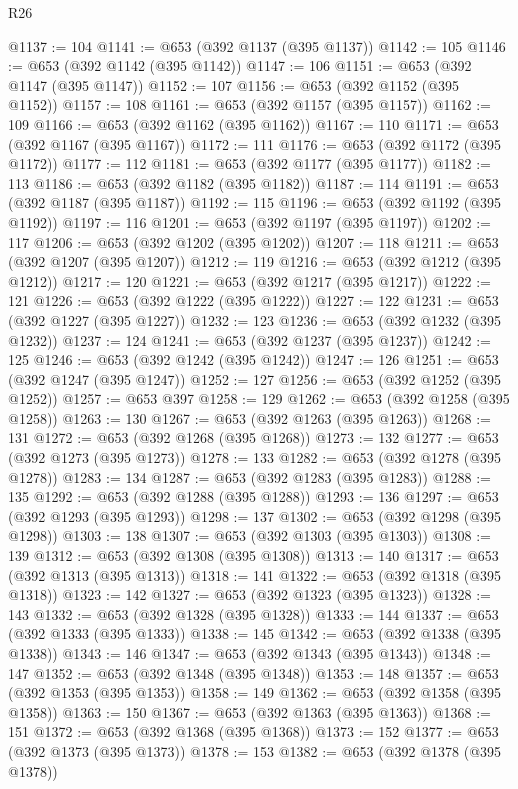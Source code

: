 \begin{lexlean}{R26}
\begin{coremodule}
@1137 := 104
@1141 := @653 (@392 @1137 (@395 @1137))
@1142 := 105
@1146 := @653 (@392 @1142 (@395 @1142))
@1147 := 106
@1151 := @653 (@392 @1147 (@395 @1147))
@1152 := 107
@1156 := @653 (@392 @1152 (@395 @1152))
@1157 := 108
@1161 := @653 (@392 @1157 (@395 @1157))
@1162 := 109
@1166 := @653 (@392 @1162 (@395 @1162))
@1167 := 110
@1171 := @653 (@392 @1167 (@395 @1167))
@1172 := 111
@1176 := @653 (@392 @1172 (@395 @1172))
@1177 := 112
@1181 := @653 (@392 @1177 (@395 @1177))
@1182 := 113
@1186 := @653 (@392 @1182 (@395 @1182))
@1187 := 114
@1191 := @653 (@392 @1187 (@395 @1187))
@1192 := 115
@1196 := @653 (@392 @1192 (@395 @1192))
@1197 := 116
@1201 := @653 (@392 @1197 (@395 @1197))
@1202 := 117
@1206 := @653 (@392 @1202 (@395 @1202))
@1207 := 118
@1211 := @653 (@392 @1207 (@395 @1207))
@1212 := 119
@1216 := @653 (@392 @1212 (@395 @1212))
@1217 := 120
@1221 := @653 (@392 @1217 (@395 @1217))
@1222 := 121
@1226 := @653 (@392 @1222 (@395 @1222))
@1227 := 122
@1231 := @653 (@392 @1227 (@395 @1227))
@1232 := 123
@1236 := @653 (@392 @1232 (@395 @1232))
@1237 := 124
@1241 := @653 (@392 @1237 (@395 @1237))
@1242 := 125
@1246 := @653 (@392 @1242 (@395 @1242))
@1247 := 126
@1251 := @653 (@392 @1247 (@395 @1247))
@1252 := 127
@1256 := @653 (@392 @1252 (@395 @1252))
@1257 := @653 @397
@1258 := 129
@1262 := @653 (@392 @1258 (@395 @1258))
@1263 := 130
@1267 := @653 (@392 @1263 (@395 @1263))
@1268 := 131
@1272 := @653 (@392 @1268 (@395 @1268))
@1273 := 132
@1277 := @653 (@392 @1273 (@395 @1273))
@1278 := 133
@1282 := @653 (@392 @1278 (@395 @1278))
@1283 := 134
@1287 := @653 (@392 @1283 (@395 @1283))
@1288 := 135
@1292 := @653 (@392 @1288 (@395 @1288))
@1293 := 136
@1297 := @653 (@392 @1293 (@395 @1293))
@1298 := 137
@1302 := @653 (@392 @1298 (@395 @1298))
@1303 := 138
@1307 := @653 (@392 @1303 (@395 @1303))
@1308 := 139
@1312 := @653 (@392 @1308 (@395 @1308))
@1313 := 140
@1317 := @653 (@392 @1313 (@395 @1313))
@1318 := 141
@1322 := @653 (@392 @1318 (@395 @1318))
@1323 := 142
@1327 := @653 (@392 @1323 (@395 @1323))
@1328 := 143
@1332 := @653 (@392 @1328 (@395 @1328))
@1333 := 144
@1337 := @653 (@392 @1333 (@395 @1333))
@1338 := 145
@1342 := @653 (@392 @1338 (@395 @1338))
@1343 := 146
@1347 := @653 (@392 @1343 (@395 @1343))
@1348 := 147
@1352 := @653 (@392 @1348 (@395 @1348))
@1353 := 148
@1357 := @653 (@392 @1353 (@395 @1353))
@1358 := 149
@1362 := @653 (@392 @1358 (@395 @1358))
@1363 := 150
@1367 := @653 (@392 @1363 (@395 @1363))
@1368 := 151
@1372 := @653 (@392 @1368 (@395 @1368))
@1373 := 152
@1377 := @653 (@392 @1373 (@395 @1373))
@1378 := 153
@1382 := @653 (@392 @1378 (@395 @1378))

\end{coremodule}
\end{lexlean}
